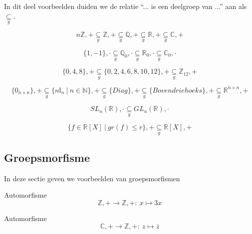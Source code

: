\documentclass[main.tex]{subfiles}
\begin{document}
In dit deel voorbeelden duiden we de relatie ``... is een deelgroep van ...'' aan als $\underset{g}{\subseteq}$.

\begin{vb}
  \[ n\mathbb{Z},+ \underset{g}{\subseteq} \mathbb{Z},+ \underset{g}{\subseteq} \mathbb{Q},+ \underset{g}{\subseteq} \mathbb{R},+ \underset{g}{\subseteq} \mathbb{C},+ \]
\end{vb}

\begin{vb}
  \[ \{ 1,-1\},\cdot \underset{g}{\subseteq} \mathbb{Q}_{0},\cdot \underset{g}{\subseteq} \mathbb{R}_{0},\cdot \underset{g}{\subseteq} \mathbb{C}_{0},\cdot \]
\end{vb}

\begin{vb}
  \[ \{ 0,4,8\},+ \underset{g}{\subseteq} \{ 0,2,4,6,8,10,12\},+ \underset{g}{\subseteq} \mathbb{Z}_{12},+ \]
\end{vb}

\begin{vb}
  \[ \{0_{n\times n}\},+ \underset{g}{\subseteq} \{ n\mathbb{I}_{n} \ |\ n \in \mathbb{N} \},+ \underset{g}{\subseteq} \{ Diag \},+ \underset{g}{\subseteq} \{ Bovendriehoeks \},+ \underset{g}{\subseteq} \mathbb{R}^{n\times n},+ \]
\end{vb}

\begin{vb}
  \[ SL_{n}(\mathbb{R}),\cdot \underset{g}{\subseteq} GL_{n}(\mathbb{R}),\cdot \]
\end{vb}

\begin{vb}
  \[ \{f \in \mathbb{R}[X] \ |\ gr(f) \le r\},+ \underset{g}{\subseteq} \mathbb{R}[X],+ \]
\end{vb} 

\subsection{Groepsmorfisme}


In deze sectie geven we voorbeelden van groepsmorfismen

\begin{vb}
  Automorfisme
  \[ \mathbb{Z},+ \rightarrow \mathbb{Z},+:\ x \mapsto 3x \]
\end{vb}

\begin{vb}
  Automorfisme
  \[ \mathbb{C},+ \rightarrow \mathbb{Z},+:\ z \mapsto \bar{z} \]
\end{vb}
\end{document}
